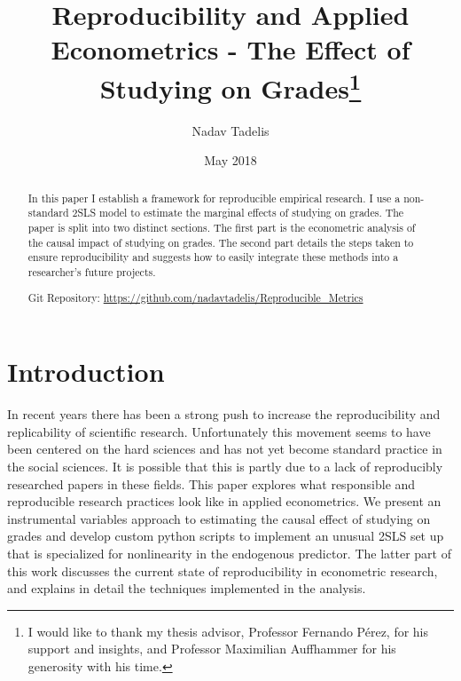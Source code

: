 \documentclass[12pt]{article}
\begin{document}
\title{Reproducibility and Applied Econometrics - The Effect of Studying on Grades\footnote{I would like to thank my thesis advisor, Professor Fernando P\'erez, for his support and insights, and Professor Maximilian Auffhammer for his generosity with his time.}}

\author{Nadav Tadelis}

\date{May 2018}



\maketitle

\hskip 80pt 


\begin{abstract}
In this paper I establish a framework for reproducible empirical research. I use a non-standard 2SLS model to estimate the marginal effects of studying on grades. The paper is split into two distinct sections. The first part is the econometric analysis of the causal impact of studying on grades. The second part details the steps taken to ensure reproducibility and suggests how to easily integrate these methods into a researcher's future projects.

\vspace{3mm}
\noindent Git Repository: \url{https://github.com/nadavtadelis/Reproducible_Metrics}
\end{abstract}

\clearpage


\section{Introduction}
\label{sec_intro}
In recent years there has been a strong push to increase the reproducibility and replicability of scientific research. Unfortunately this movement seems to have been centered on the hard sciences and has not yet become standard practice in the social sciences. It is possible that this is partly due to a lack of reproducibly researched papers in these fields. This paper explores what responsible and reproducible research practices look like in applied econometrics. We present an instrumental variables approach to estimating the causal effect of studying on grades and develop custom python scripts to implement an unusual 2SLS set up that is specialized for nonlinearity in the endogenous predictor. The latter part of this work discusses the current state of reproducibility in econometric research, and explains in detail the techniques implemented in the analysis.
\end{document}
